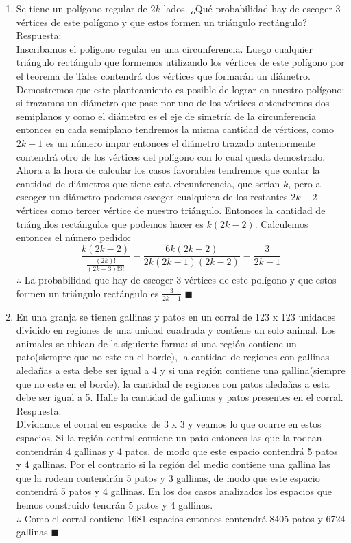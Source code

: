 \documentclass{book}
\begin{document}
\begin{enumerate}
    \item Se tiene un polígono regular de $2k$ lados. ¿Qué probabilidad hay de escoger 3 vértices de este polígono y que estos formen un triángulo rectángulo?\\
          Respuesta:\\
          Inscribamos el polígono regular en una circunferencia. Luego cualquier triángulo rectángulo que formemos utilizando los vértices de este polígono por el teorema de Tales contendrá dos vértices que formarán un diámetro. Demostremos que este planteamiento es posible de lograr en nuestro polígono: si trazamos un diámetro que pase por uno de los vértices obtendremos dos semiplanos y como el diámetro es el eje de simetría de la circunferencia entonces en cada semiplano tendremos la misma cantidad de vértices, como $2k-1$ es un número impar entonces el diámetro trazado anteriormente contendrá otro de los vértices del polígono con lo cual queda demostrado.
          Ahora a la hora de calcular los casos favorables tendremos que contar la cantidad de diámetros que tiene esta circunferencia, que serían $k$, pero al escoger un diámetro podemos escoger cualquiera de los restantes $2k-2$ vértices como tercer vértice de nuestro triángulo. Entonces la cantidad de triángulos rectángulos que podemos hacer es $k(2k-2)$. Calculemos entonces el número pedido:
          $$\frac{k(2k-2)}{\frac{(2k)!}{(2k-3)!3!}}=\frac{6k(2k-2)}{2k(2k-1)(2k-2)}=\frac{3}{2k-1}$$
          $\therefore$ La probabilidad que hay de escoger 3 vértices de este polígono y que estos formen un triángulo rectángulo es $\displaystyle{\frac{3}{2k-1}}$ $\blacksquare$\\
    \item En una granja se tienen gallinas y patos en un corral de 123 x 123 unidades dividido en regiones de una unidad cuadrada y contiene un solo animal. Los animales se ubican de la siguiente forma: si una región contiene un pato(siempre que no este en el borde), la cantidad de regiones con gallinas aledañas a esta debe ser igual a 4 y si una región contiene una gallina(siempre que no este en el borde), la cantidad de regiones con patos aledañas a esta debe ser igual a 5. Halle la cantidad de gallinas y patos presentes en el corral.\\
          Respuesta:\\
          Dividamos el corral en espacios de 3 x 3 y veamos lo que ocurre en estos espacios. Si la región central contiene un pato entonces las que la rodean contendrán 4 gallinas y 4 patos, de modo que este espacio contendrá 5 patos y 4 gallinas. Por el contrario si la región del medio contiene una gallina las que la rodean contendrán 5 patos y 3 gallinas, de modo que este espacio contendrá 5 patos y 4 gallinas. En los dos casos analizados los espacios que hemos construido tendrán 5 patos y 4 gallinas. \\$\therefore$ Como el corral contiene 1681 espacios entonces contendrá 8405 patos y 6724 gallinas $\blacksquare$ \\

\end{enumerate}
\end{document}

